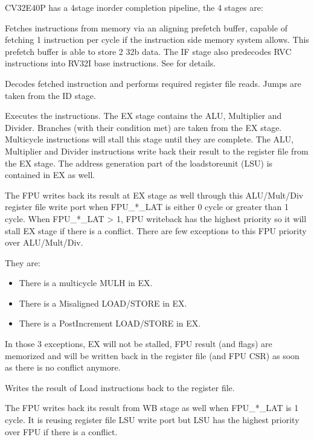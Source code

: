 \documentclass[letterpaper,10pt,english]{sphinxmanual}
\begin{document}
\sphinxAtStartPar
CV32E40P has a 4\sphinxhyphen{}stage in\sphinxhyphen{}order completion pipeline, the 4 stages are:
\begin{description}
\sphinxAtStartPar
Fetches instructions from memory via an aligning prefetch buffer, capable of fetching 1 instruction per cycle if the instruction side memory system allows. This prefetch buffer is able to store 2 32\sphinxhyphen{}b data.
The IF stage also pre\sphinxhyphen{}decodes RVC instructions into RV32I base instructions. See {\hyperref[\detokenize{instruction_fetch:instruction-fetch}]{}} for details.

\sphinxAtStartPar
Decodes fetched instruction and performs required register file reads. Jumps are taken from the ID stage.

\sphinxAtStartPar
Executes the instructions. The EX stage contains the ALU, Multiplier and Divider. Branches (with their condition met) are taken from the EX stage. Multi\sphinxhyphen{}cycle instructions will stall this stage until they are complete.
The ALU, Multiplier and Divider instructions write back their result to the register file from the EX stage. The address generation part of the load\sphinxhyphen{}store\sphinxhyphen{}unit (LSU) is contained in EX as well.

\sphinxAtStartPar
The FPU writes back its result at EX stage as well through this ALU/Mult/Div register file write port when FPU\_*\_LAT is either 0 cycle or greater than 1 cycle.
When FPU\_*\_LAT \textgreater{} 1, FPU write\sphinxhyphen{}back has the highest priority so it will stall EX stage if there is a conflict. There are few exceptions to this FPU priority over ALU/Mult/Div.

\sphinxAtStartPar
They are:
\begin{itemize}
\item {} 
\sphinxAtStartPar
There is a multi\sphinxhyphen{}cycle MULH in EX.

\item {} 
\sphinxAtStartPar
There is a Misaligned LOAD/STORE in EX.

\item {} 
\sphinxAtStartPar
There is a Post\sphinxhyphen{}Increment LOAD/STORE in EX.

\end{itemize}

\sphinxAtStartPar
In those 3 exceptions, EX will not be stalled, FPU result (and flags) are memorized and will be written back in the register file (and FPU CSR) as soon as there is no conflict anymore.

\sphinxAtStartPar
Writes the result of Load instructions back to the register file.

\sphinxAtStartPar
The FPU writes back its result from WB stage as well when FPU\_*\_LAT is 1 cycle. It is reusing register file LSU write port but LSU has the highest priority over FPU if there is a conflict.

\end{description}
\end{document}
